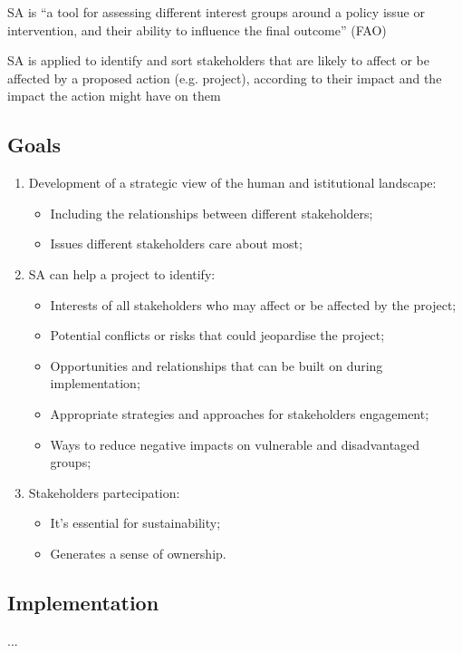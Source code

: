 \documentclass{article}
\begin{document}
SA is ``a tool for assessing different interest groups around a policy issue or intervention, and
their ability to influence the final outcome'' (FAO)

SA is applied to identify and sort stakeholders that are likely to affect or be affected by a
proposed action (e.g. project), according to their impact and the impact the action might have
on them

\subsection{Goals}
\begin{enumerate}
    \item Development of a strategic view of the human and istitutional landscape:
    \begin{itemize}
        \item Including the relationships between different stakeholders;
        \item Issues different stakeholders care about most;
    \end{itemize}
    \item SA can help a project to identify:
    \begin{itemize}
        \item Interests of all stakeholders who may affect or be affected by the project;
        \item Potential conflicts or risks that could jeopardise the project;
        \item Opportunities and relationships that can be built on during implementation;
        \item Appropriate strategies and approaches for stakeholders engagement;
        \item Ways to reduce negative impacts on vulnerable and disadvantaged groups;
    \end{itemize}
    \item Stakeholders partecipation:
    \begin{itemize}
        \item It's essential for sustainability;
        \item Generates a sense of ownership.
    \end{itemize}
\end{enumerate}

\subsection{Implementation}
...
\end{document}
